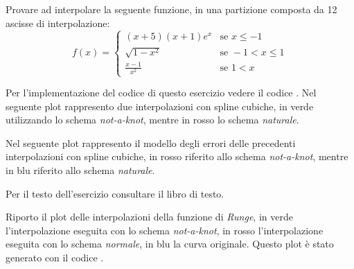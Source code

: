 \begin{exercise} 
Provare ad interpolare la seguente funzione, in una partizione composta da 12
ascisse di interpolazione:
\begin{displaymath}
f(x) = \left \lbrace 
\begin{matrix}
	(x+5)(x+1)e^{x} & \text{se } x \leq -1 \\
	\sqrt{1 - x^{2}} & \text{se } -1 < x \leq 1 \\
	\frac{x-1}{x^{2}} & \text{se } 1 < x
\end{matrix} 
\right. 
\end{displaymath}
\end{exercise}
Per l'implementazione del codice di questo esercizio vedere il codice
.
Nel seguente plot rappresento due interpolazioni con spline cubiche, in verde
utilizzando lo schema \emph{not-a-knot}, mentre in rosso lo schema
\emph{naturale}.
\begin{center}   

\end{center}
Nel seguente plot rappresento il modello degli errori delle precedenti
interpolazioni con spline cubiche, in rosso riferito allo
schema \emph{not-a-knot}, mentre in blu riferito allo schema \emph{naturale}.
\begin{center}   

\end{center}

\begin{exercise}[4.19] 
Per il testo dell'esercizio consultare il libro di testo. 
\end{exercise}
Riporto il plot delle interpolazioni della funzione di \emph{Runge}, in verde
l'interpolazione eseguita con lo schema \emph{not-a-knot}, in rosso
l'interpolazione eseguita con lo schema \emph{normale}, in blu la curva
originale. Questo plot \`e stato generato con il codice
.
\begin{center}   

\end{center}
\begin{center}   

\end{center}





